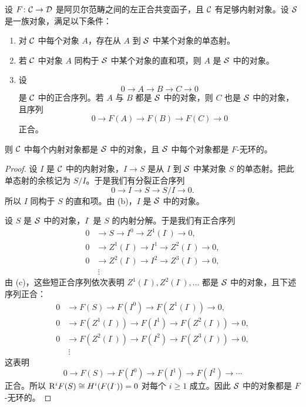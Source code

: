 \begin{proposition}\label{it:2.1.3}
设 $F\colon\mathcal{C}\to\mathcal{D}$ 是阿贝尔范畴之间的左正合共变函子，且 $\mathcal{C}$ 有足够内射对象。设 $\mathcal{S}$ 是一族对象，满足以下条件：
\begin{enumerate}[label=(\alph*),leftmargin=2.4em]
  \item 对 $\mathcal{C}$ 中每个对象 $A$，存在从 $A$ 到 $\mathcal{S}$ 中某个对象的单态射。
  \item 若 $\mathcal{C}$ 中对象 $A$ 同构于 $\mathcal{S}$ 中某个对象的直和项，则 $A$ 是 $\mathcal{S}$ 中的对象。
  \item 设
  \[
  0\to A\to B\to C\to 0
  \]
  是 $\mathcal{C}$ 中的正合序列。若 $A$ 与 $B$ 都是 $\mathcal{S}$ 中的对象，则 $C$ 也是 $\mathcal{S}$ 中的对象，且序列
  \[
  0\to F(A)\to F(B)\to F(C)\to 0
  \]
  正合。
\end{enumerate}
则 $\mathcal{C}$ 中每个内射对象都是 $\mathcal{S}$ 中的对象，且 $\mathcal{S}$ 中每个对象都是 $F$-无环的。
\end{proposition}
\begin{proof}
设 $I$ 是 $\mathcal{C}$ 中的内射对象，$I\to S$ 是从 $I$ 到 $\mathcal{S}$ 中某对象 $S$ 的单态射。把此单态射的余核记为 $S/I$。于是我们有分裂正合序列
\[
0\to I\to S\to S/I\to 0.
\]
所以 $I$ 同构于 $S$ 的直和项。由 (b)，$I$ 是 $\mathcal{S}$ 中的对象。

设 $S$ 是 $\mathcal{S}$ 中的对象，$I^\cdot$ 是 $S$ 的内射分解。于是我们有正合序列
\[
\begin{aligned}
0&\to S\to I^0\to Z^1(I^\cdot)\to 0,\\
0&\to Z^1(I^\cdot)\to I^1\to Z^2(I^\cdot)\to 0,\\
0&\to Z^2(I^\cdot)\to I^2\to Z^3(I^\cdot)\to 0,\\
&\ \vdots
\end{aligned}
\]
由 (c)，这些短正合序列依次表明 $Z^1(I^\cdot),Z^2(I^\cdot),\dots$ 都是 $\mathcal{S}$ 中的对象，且下述序列正合：
\[
\begin{aligned}
0&\to F(S)\to F(I^0)\to F(Z^1(I^\cdot))\to 0,\\
0&\to F(Z^1(I^\cdot))\to F(I^1)\to F(Z^2(I^\cdot))\to 0,\\
0&\to F(Z^2(I^\cdot))\to F(I^2)\to F(Z^3(I^\cdot))\to 0,\\
&\ \vdots
\end{aligned}
\]
这表明
\[
0\to F(S)\to F(I^0)\to F(I^1)\to F(I^2)\to\cdots
\]
正合。所以 $\mathrm{R}^iF(S)\cong H^i(F(I^\cdot))=0$ 对每个 $i\ge1$ 成立。因此 $\mathcal{S}$ 中的对象都是 $F$-无环的。
\end{proof}


